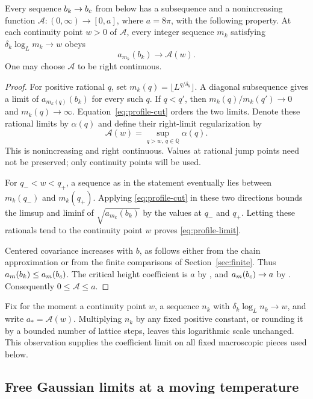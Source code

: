 \begin{proposition}\label{prop:profile}
Every sequence $b_k\to b_c$ from below has a subsequence and a
nonincreasing function $\mathcal A:(0,\infty)\to[0,a]$, where
$a=8\pi$, with the following property. At each continuity point
$w>0$ of $\mathcal A$, every integer sequence $m_k$ satisfying
$\delta_k\log_L m_k\to w$ obeys
\begin{equation}\label{eq:profile-limit}
                         a_{m_k}(b_k)\longrightarrow\mathcal A(w).
\end{equation}
One may choose $\mathcal A$ to be right continuous.
\end{proposition}

\begin{proof}
For positive rational $q$, set $m_k(q)=\lfloor L^{q/\delta_k}\rfloor$.
A diagonal subsequence gives a limit of $a_{m_k(q)}(b_k)$ for every
such $q$. If $q<q'$, then $m_k(q)/m_k(q')\to0$ and
$m_k(q)\to\infty$. Equation~\eqref{eq:profile-cut} orders the two
limits. Denote these rational limits by $\alpha(q)$ and define their
right-limit regularization by
\[
             \mathcal A(w)=\sup_{q>w,\ q\in\mathbb Q}\alpha(q).
\]
This is nonincreasing and right continuous. Values at rational jump
points need not be preserved; only continuity points will be used.

For $q_-<w<q_+$, a sequence as in the statement eventually lies between
$m_k(q_-)$ and $m_k(q_+)$. Applying \eqref{eq:profile-cut} in these two
directions bounds the limsup and liminf of $\sqrt{a_{m_k}(b_k)}$ by
the values at $q_-$ and $q_+$. Letting these rationals tend to the
continuity point $w$ proves \eqref{eq:profile-limit}.

Centered covariance increases with $b$, as follows either from the
chain approximation or from the finite comparisons of
Section~\ref{sec:finite}. Thus $a_m(b_k)\le a_m(b_c)$. The critical
height coefficient is $a$ by \cite[Section~6]{X}, and
$a_m(b_c)\to a$ by \cite[Theorem~2.4]{X}.
Consequently $0\le\mathcal A\le a$.
\end{proof}

Fix for the moment a continuity point $w$, a sequence $n_k$ with
$\delta_k\log_Ln_k\to w$, and write $a_*=\mathcal A(w)$.
Multiplying $n_k$ by any fixed positive constant, or rounding it by a
bounded number of lattice steps, leaves this logarithmic scale
unchanged. This observation supplies the coefficient limit on all
fixed macroscopic pieces used below.

\subsection{Free Gaussian limits at a moving temperature}

